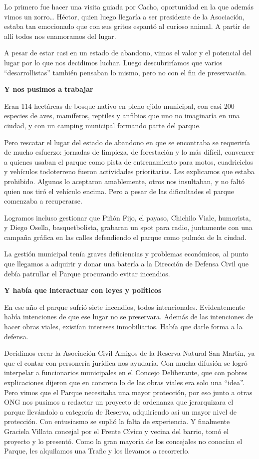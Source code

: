 \begin{fullwidth}
Lo primero fue hacer una visita guiada por Cacho, oportunidad en la que
además vimos un zorro\ldots{} Héctor, quien luego llegaría a ser
presidente de la Asociación, estaba tan emocionado que con sus gritos
espantó al curioso animal. A partir de allí todos nos enamoramos del
lugar.

A pesar de estar casi en un estado de abandono, vimos el valor y el
potencial del lugar por lo que nos decidimos luchar. Luego
descubriríamos que varios ``desarrollistas'' también pensaban lo mismo,
pero no con el fin de preservación.

\textbf{Y nos pusimos a trabajar}

Eran 114 hectáreas de bosque nativo en pleno ejido municipal, con casi
200 especies de aves, mamíferos, reptiles y anfibios que uno no
imaginaría en una ciudad, y con un camping municipal formando parte del
parque.

Pero rescatar el lugar del estado de abandono en que se encontraba se
requeriría de mucho esfuerzo: jornadas de limpieza, de forestación y lo
más difícil, convencer a quienes usaban el parque como pista de
entrenamiento para motos, cuadriciclos y vehículos todoterreno fueron
actividades prioritarias. Les explicamos que estaba prohibido. Algunos
lo aceptaron amablemente, otros nos insultaban, y no faltó quien nos
tiró el vehículo encima. Pero a pesar de las dificultades el parque
comenzaba a recuperarse.

Logramos incluso gestionar que Piñón Fijo, el payaso, Chichilo Viale,
humorista, y Diego Osella, basquetbolista, grabaran un spot para radio,
juntamente con una campaña gráfica en las calles defendiendo el parque
como pulmón de la ciudad.

La gestión municipal tenía graves deficiencias y problemas económicos,
al punto que llegamos a adquirir y donar una batería a la Dirección de
Defensa Civil que debía patrullar el Parque procurando evitar incendios.

\textbf{Y había que interactuar con leyes y políticos}

En ese año el parque sufrió siete incendios, todos intencionales.
Evidentemente había intenciones de que ese lugar no se preservara.
Además de las intenciones de hacer obras viales, existían intereses
inmobiliarios. Había que darle forma a la defensa.

Decidimos crear la Asociación Civil Amigos de la Reserva Natural San
Martín, ya que el contar con personería jurídica nos ayudaría. Con mucha
difusión se logró interpelar a funcionarios municipales en el Concejo
Deliberante, que con pobres explicaciones dijeron que en concreto lo de
las obras viales era solo una ``idea''. Pero vimos que el Parque
necesitaba una mayor protección, por eso junto a otras ONG nos pusimos a
redactar un proyecto de ordenanza que jerarquizara el parque llevándolo
a categoría de Reserva, adquiriendo así un mayor nivel de protección.
Con entusiasmo se suplió la falta de experiencia. Y finalmente Graciela
Villata concejal por el Frente Cívico y vecina del barrio, tomó el
proyecto y lo presentó. Como la gran mayoría de los concejales no
conocían el Parque, les alquilamos una Trafic y los llevamos a
recorrerlo.


\end{fullwidth}
